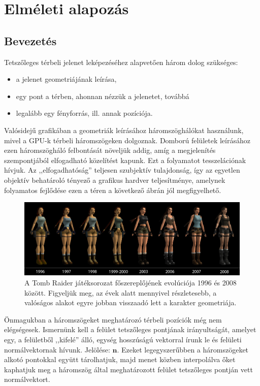 
\section{Elméleti alapozás}

\subsection{Bevezetés}

Tetszőleges térbeli jelenet leképezéséhez alapvetően három dolog szükséges:

\begin{itemize}[noitemsep]
\item a jelenet geometriájának leírása,
\item egy pont a térben, ahonnan nézzük a jelenetet, továbbá
\item legalább egy fényforrás, ill. annak pozíciója.
\end{itemize}

Valósidejű grafikában a geometriák leírásához háromszöghálókat használunk, mivel a GPU-k térbeli háromszögeken dolgoznak. Domború felületek leírásához ezen háromszögháló felbontását növeljük addig, amíg a megjelenítés szempontjából elfogadható közelítést kapunk. Ezt a folyamatot tesszelációnak hívjuk. Az ,,elfogadhatóság'' teljesen szubjektív tulajdonság, így az egyetlen objektív behatároló tényező a grafikus hardver teljesítménye, amelynek folyamatos fejlődése ezen a téren a következő ábrán jól megfigyelhető.

\begin{figure}[!ht]
    \label{fig:tomb_raider_evolution}
    \centering
    \includegraphics[width=1.0\textwidth]{images/tomb_raider_evolution.png}
    \caption{A Tomb Raider játéksorozat főszereplőjének evolúciója 1996 és 2008 között. Figyeljük meg, az évek alatt mennyivel részletesebb, a valóságos alakot egyre jobban visszaadó lett a karakter geometriája. }
\end{figure}

Önmagukban a háromszögeket meghatározó térbeli pozíciók még nem elégségesek. Ismernünk kell a felület tetszőleges pontjának irányultságát, amelyet egy, a felületből ,,kifelé'' álló, egység hosszúságú vektorral írunk le és felületi normálvektornak hívunk. Jelölése: \(\mathbf{n}\). Ezeket legegyszerűbben a háromszögeket alkotó pontokkal együtt tárolhatjuk, majd menet közben interpolálva őket kaphatjuk meg a háromszög által meghatározott felület tetszőleges pontján vett normálvektort.

